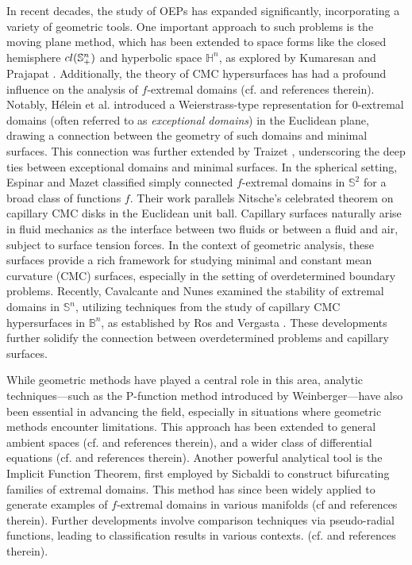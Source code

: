 \documentclass[11pt]{article}
\numberwithin{equation} {section}
\begin{document}
In recent decades, the study of OEPs has expanded significantly, incorporating a variety of geometric tools. One important approach to such problems is the moving plane method, which has been extended to space forms like the closed hemisphere \(\textup{cl}(\mathbb{S}^n_+)\) and hyperbolic space \(\mathbb{H}^n\), as explored by Kumaresan and Prajapat \cite{KP}. Additionally, the theory of CMC hypersurfaces has had a profound influence on the analysis of \(f\)-extremal domains (cf. \cite{Ber, EFM, EMao, Rei2, RRS} and references therein). Notably, Hélein et al. \cite{Hel} introduced a Weierstrass-type representation for \(0\)-extremal domains (often referred to as \textit{exceptional domains}) in the Euclidean plane, drawing a connection between the geometry of such domains and minimal surfaces. This connection was further extended by Traizet \cite{Trai}, underscoring the deep ties between exceptional domains and minimal surfaces. In the spherical setting, Espinar and Mazet \cite{EM} classified simply connected \(f\)-extremal domains in \(\mathbb{S}^2\) for a broad class of functions \(f\). Their work parallels Nitsche’s celebrated theorem \cite{JNit} on capillary CMC disks in the Euclidean unit ball. Capillary surfaces naturally arise in fluid mechanics as the interface between two fluids or between a fluid and air, subject to surface tension forces. In the context of geometric analysis, these surfaces provide a rich framework for studying minimal and constant mean curvature (CMC) surfaces, especially in the setting of overdetermined boundary problems. Recently, Cavalcante and Nunes \cite{Cav} examined the stability of extremal domains in \(\mathbb{S}^n\), utilizing techniques from the study of capillary CMC hypersurfaces in \(\mathbb{B}^n\), as established by Ros and Vergasta \cite{RosVer}. These developments further solidify the connection between overdetermined problems and capillary surfaces.

While geometric methods have played a central role in this area, analytic techniques—such as the P-function method introduced by Weinberger—have also been essential in advancing the field, especially in situations where geometric methods encounter limitations. This approach has been extended to general ambient spaces (cf. \cite{And,CV} and references therein), and a wider class of differential equations (cf. \cite{FarVal, Gao} and references therein). Another powerful analytical tool is the Implicit Function Theorem, first employed by Sicbaldi \cite{Sic} to construct bifurcating families of extremal domains. This method has since been widely applied to generate examples of \(f\)-extremal domains in various manifolds (cf \cite{FM,FMW2, Kam,Ruiz} and references therein). Further developments involve comparison techniques via pseudo-radial functions, leading to classification results in various contexts. (cf. \cite{ABBM,ABM,Chr} and references therein).
\end{document}

